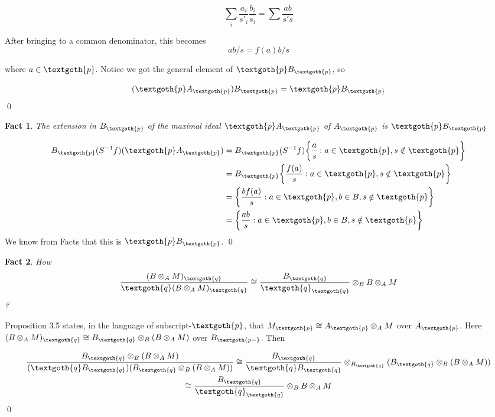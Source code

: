 \documentclass{article}
\newtheorem{theorem}{Fact}[section]
\begin{document}
\[
 \sum_i \frac{a_i}{s'_i} \frac{b_i}{s_i} = \sum \frac{ab}{s's}
\]

\noindent
After bringing to a common denominator, this becomes
\[
 ab/s = f(a)b/s
\]

\noindent
where $a \in \textgoth{p}$. Notice we got the general element of $\textgoth{p} B_\textgoth{p}$, so

\[
 (\textgoth{p} A_\textgoth{p}) B_\textgoth{p} = \textgoth{p} B_\textgoth{p}
\]
\qed

\bigskip
\begin{theorem}
The extension in $B_\textgoth{p}$ of the maximal ideal $\textgoth{p}A_\textgoth{p}$ of $A_\textgoth{p}$ is $\textgoth{p}B_\textgoth{p}$
\end{theorem}

\noindent
\begin{align*}
  B_\textgoth{p}(S^{-1}f)(\textgoth{p}A_\textgoth{p}) & = B_\textgoth{p}(S^{-1}f) \bigg \{\frac{a}{s}: a \in \textgoth{p}, s \notin \textgoth{p} \bigg \} \\
  & = B_\textgoth{p} \bigg\{ \frac{f(a)}{s}: a \in \textgoth{p}, s \notin \textgoth{p} \bigg\} \\
  & = \bigg\{ \frac{bf(a)}{s}: a \in \textgoth{p}, b \in B, s \notin \textgoth{p} \bigg\} \\
  & = \bigg\{ \frac{ab}{s}: a \in \textgoth{p}, b \in B, s \notin \textgoth{p} \bigg\} 
\end{align*}
We know from Facts that this is $\textgoth{p}B_\textgoth{p}$.
\qed

\bigskip
\begin{theorem}
How
\[
\frac{(B \otimes_A M)_\textgoth{q}}{\textgoth{q} (B \otimes_A M)_\textgoth{q}} 
\cong
\frac{B_\textgoth{q}}{\textgoth{q}_\textgoth{q}} \otimes_B B \otimes_A M
\]
?
\end{theorem}

\noindent
Proposition 3.5 states, in the language of subscript-$\textgoth{p}$, that $M_\textgoth{p} \cong A_\textgoth{p} \otimes_A M$ over $A_\textgoth{p}$. Here $(B \otimes_
A M)_\textgoth{q} \cong B_\textgoth{q} \otimes_B (B \otimes_A M)$ over $B_\textgoth{p-}$. Then

\begin{gather*}
\frac{B_\textgoth{q} \otimes_B (B \otimes_A M)}{(\textgoth{q} B_\textgoth{q})(B_\textgoth{q} \otimes_B (B \otimes_A M))}
\cong
\frac{B_\textgoth{q}}{\textgoth{q} B_\textgoth{q}} \otimes_{B_\textgoth{q}} (B_\textgoth{q} \otimes_B (B \otimes_A M)) \\
\cong
\frac{B_\textgoth{q}}{\textgoth{q}_\textgoth{q}} \otimes_B B \otimes_A M
\end{gather*}
\qed
\end{document}
